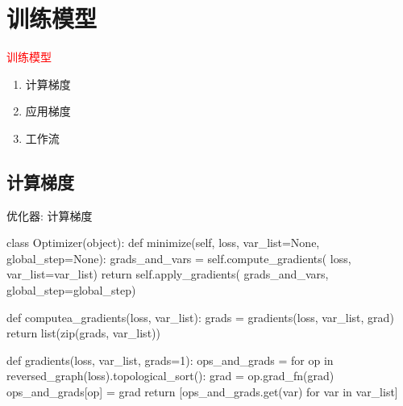 \section{训练模型}
\label{sec:train-model}

\begin{frame}
  \begin{center}
    \Huge{\textcolor{red}{训练模型}}
  \end{center}

  \begin{enumerate}
    \item \alert{计算梯度}
    \item \alert{应用梯度}    
    \item \alert{工作流}
  \end{enumerate}    
\end{frame}

\subsection{计算梯度}

\begin{frame}[fragile]{优化器: 计算梯度}
  \begin{python} 
class Optimizer(object):
  def minimize(self, loss, var_list=None, global_step=None):
    grads_and_vars = self.compute_gradients(
      loss, var_list=var_list)
    return self.apply_gradients(
      grads_and_vars, 
      global_step=global_step)

  def computea_gradients(loss, var_list):
    grads = gradients(loss, var_list, grad)
    return list(zip(grads, var_list))

  def gradients(loss, var_list, grads=1):
    ops_and_grads = {}
    for op in reversed_graph(loss).topological_sort():
      grad = op.grad_fn(grad)
      ops_and_grads[op] = grad
    return [ops_and_grads.get(var) for var in var_list]
  \end{python}
\end{frame}

